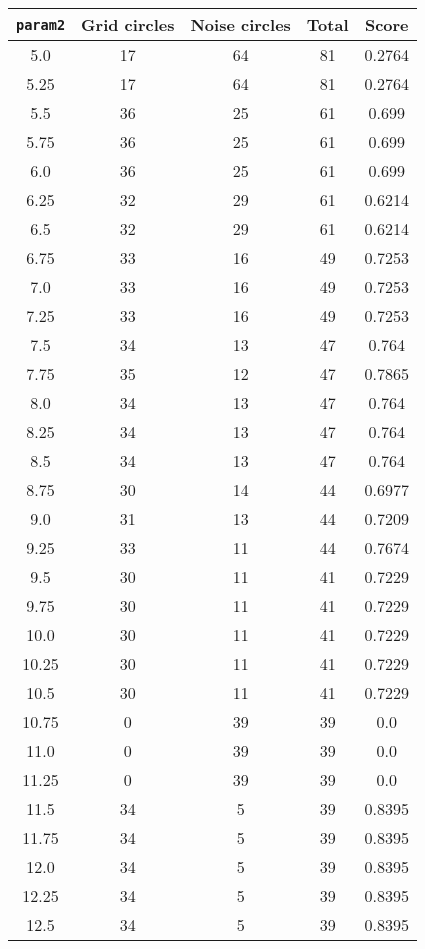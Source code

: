 \documentclass[letterpaper, 12pt]{article}
\begin{document}
\begin{longtable}{|c|c|c|c|c|}
\hline
\textbf{\texttt{param2}} & \textbf{Grid circles} & \textbf{Noise circles} & \textbf{Total} & \textbf{Score} \\
\hline
5.0 & 17 & 64 & 81 & 0.2764 \\
\hline
5.25 & 17 & 64 & 81 & 0.2764 \\
\hline
5.5 & 36 & 25 & 61 & 0.699 \\
\hline
5.75 & 36 & 25 & 61 & 0.699 \\
\hline
6.0 & 36 & 25 & 61 & 0.699 \\
\hline
6.25 & 32 & 29 & 61 & 0.6214 \\
\hline
6.5 & 32 & 29 & 61 & 0.6214 \\
\hline
6.75 & 33 & 16 & 49 & 0.7253 \\
\hline
7.0 & 33 & 16 & 49 & 0.7253 \\
\hline
7.25 & 33 & 16 & 49 & 0.7253 \\
\hline
7.5 & 34 & 13 & 47 & 0.764 \\
\hline
7.75 & 35 & 12 & 47 & 0.7865 \\
\hline
8.0 & 34 & 13 & 47 & 0.764 \\
\hline
8.25 & 34 & 13 & 47 & 0.764 \\
\hline
8.5 & 34 & 13 & 47 & 0.764 \\
\hline
8.75 & 30 & 14 & 44 & 0.6977 \\
\hline
9.0 & 31 & 13 & 44 & 0.7209 \\
\hline
9.25 & 33 & 11 & 44 & 0.7674 \\
\hline
9.5 & 30 & 11 & 41 & 0.7229 \\
\hline
9.75 & 30 & 11 & 41 & 0.7229 \\
\hline
10.0 & 30 & 11 & 41 & 0.7229 \\
\hline
10.25 & 30 & 11 & 41 & 0.7229 \\
\hline
10.5 & 30 & 11 & 41 & 0.7229 \\
\hline
10.75 & 0 & 39 & 39 & 0.0 \\
\hline
11.0 & 0 & 39 & 39 & 0.0 \\
\hline
11.25 & 0 & 39 & 39 & 0.0 \\
\hline
11.5 & 34 & 5 & 39 & 0.8395 \\
\hline
11.75 & 34 & 5 & 39 & 0.8395 \\
\hline
12.0 & 34 & 5 & 39 & 0.8395 \\
\hline
12.25 & 34 & 5 & 39 & 0.8395 \\
\hline
12.5 & 34 & 5 & 39 & 0.8395 \\

\end{longtable}
\end{document}
